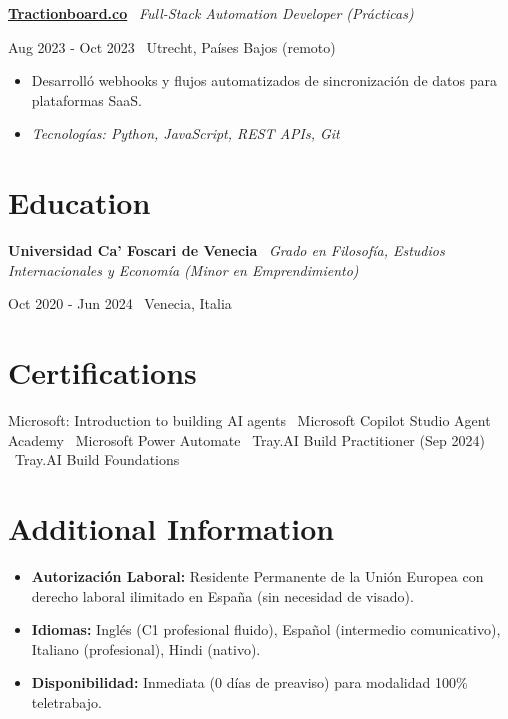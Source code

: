 \documentclass[a4paper,10pt]{article}
\newcommand{\role}[4]{%
  \vspace{2pt}\noindent
  \begin{minipage}[t]{0.70\textwidth}\raggedright\textbf{#1} \textbullet\ \textit{#3}\end{minipage}%
  \hfill
  \begin{minipage}[t]{0.28\textwidth}\raggedleft\footnotesize\color{gray}#2 \textbullet\ #4\end{minipage}%
  \vspace{1pt}%
}
\begin{document}
\role{\href{https://tractionboard.co}{Tractionboard.co}}{Aug 2023 - Oct 2023}{Full-Stack Automation Developer (Prácticas)}{Utrecht, Países Bajos (remoto)}
\begin{itemize}
  \item Desarrolló webhooks y flujos automatizados de sincronización de datos para plataformas SaaS.
  \item \textit{Tecnologías: Python, JavaScript, REST APIs, Git}
\end{itemize}

\section{Education}
\role{Universidad Ca' Foscari de Venecia}{Oct 2020 - Jun 2024}{Grado en Filosofía, Estudios Internacionales y Economía (Minor en Emprendimiento)}{Venecia, Italia}

\section{Certifications}
Microsoft: Introduction to building AI agents \textbullet\ Microsoft Copilot Studio Agent Academy \textbullet\ Microsoft Power Automate \textbullet\ Tray.AI Build Practitioner (Sep 2024) \textbullet\ Tray.AI Build Foundations

\section{Additional Information}
\begin{itemize}
  \item \textbf{Autorización Laboral:} Residente Permanente de la Unión Europea con derecho laboral ilimitado en España (sin necesidad de visado).
  \item \textbf{Idiomas:} Inglés (C1 profesional fluido), Español (intermedio comunicativo), Italiano (profesional), Hindi (nativo).
  \item \textbf{Disponibilidad:} Inmediata (0 días de preaviso) para modalidad 100\% teletrabajo.
\end{itemize}

\end{document}
